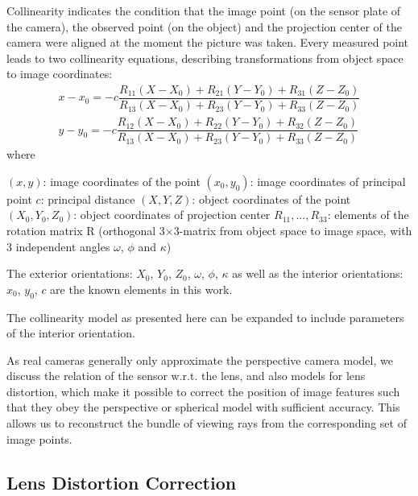 Collinearity indicates the condition that the image point (on the sensor plate of the camera), the observed point (on the object) and the projection center of the camera were aligned at the moment the picture was taken. Every measured point leads to two collinearity equations, describing transformations from object space to image coordinates:
\begin{equation} %
\begin{split}
x - x_0 = -c \dfrac {R_{11}(X-X_0) + R_{21}(Y-Y_0) + R_{31}(Z-Z_0)} {R_{13}(X-X_0) + R_{23}(Y-Y_0) + R_{33}(Z-Z_0)} \\
y - y_0 = -c \dfrac {R_{12}(X-X_0) + R_{22}(Y-Y_0) + R_{32}(Z-Z_0)} {R_{13}(X-X_0) + R_{23}(Y-Y_0) + R_{33}(Z-Z_0)}
\end{split}
\end{equation}
where\newline

$(x, y)$: image coordinates of the point \newline
$(x_0, y_0)$: image coordinates of principal point \newline
$c$: principal distance \newline
$(X, Y, Z)$: object coordinates of the point \newline
$(X_0, Y_0, Z_0)$: object coordinates of projection center \newline
$R_{11},...,R_{33}$: elements of the rotation matrix R (orthogonal 3$\times$3-matrix from object space to image space, with 3 independent angles $\omega$, $\phi$ and $\kappa$)\newline

The exterior orientations: $X_0$, $Y_0$, $Z_0$, $\omega$, $\phi$, $\kappa$ as well as the interior orientations: $x_0$, $y_0$, $c$ are the known elements in this work.



The collinearity model as presented here can be expanded to include parameters of
the interior orientation.

As real cameras generally only approximate the perspective camera model, we discuss the relation of the sensor w.r.t. the lens, and also models for lens distortion, which make it possible to correct the position of image features such that they obey the perspective or spherical model with sufficient accuracy. This allows us to reconstruct the bundle of viewing rays from the corresponding set of image points.

\subsection{Lens Distortion Correction}
\label{subsec:2.2.2.LensDistortion}

